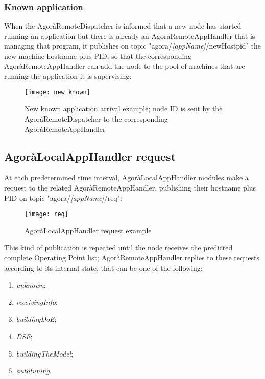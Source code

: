 \subsubsection{Known application}\label{knownApp}

When the AgoràRemoteDispatcher is informed that a new node has started running an application but there is already an AgoràRemoteAppHandler that is managing that program, it publishes on topic "agora/\textit{[appName]}/newHostpid" the new machine hostname plus PID, so that the corresponding AgoràRemoteAppHandler can add the node to the pool of machines that are running the application it is supervising:

\begin{figure}[H]

    \centering
    \texttt{[image: new\_known]}
    \caption{New known application arrival example; node ID is sent by the AgoràRemoteDispatcher to the corresponding AgoràRemoteAppHandler}
    
\end{figure}





\subsection{AgoràLocalAppHandler request}\label{clientReq}

At each predetermined time interval, AgoràLocalAppHandler modules make a request to the related AgoràRemoteAppHandler, publishing their hostname plus PID on topic "agora/\textit{[appName]}/req":

\begin{figure}[H]

    \centering
    \texttt{[image: req]}
    \caption{AgoràLocalAppHandler request example}
    
\end{figure}

This kind of publication is repeated until the node receives the predicted complete Operating Point list; AgoràRemoteAppHandler replies to these requests according to its internal state, that can be one of the following:

\begin{enumerate}

    \item \textit{unknown};

    \item \textit{receivingInfo};

    \item \textit{buildingDoE};

    \item \textit{DSE};

    \item \textit{buildingTheModel};

    \item \textit{autotuning}.

\end{enumerate}


